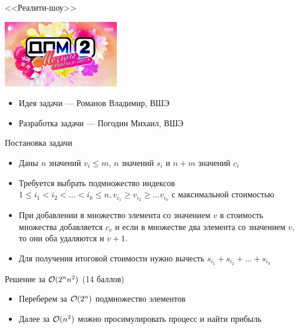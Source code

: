 \begin{frame}
  \begin{center}
    \LARGE <<Реалити-шоу>>
  \end{center}

  \begin{center}
      \includegraphics[width=5cm]{g-meme.jpg}
  \end{center}

  \begin{itemize}
  \item Идея задачи --- Романов Владимир, ВШЭ
  \item Разработка задачи --- Погодин Михаил, ВШЭ
  \end{itemize}

\end{frame}

\begin{frame}{Постановка задачи}
  \begin{itemize}
  \item Даны $n$ значений $v_i \leq m$, $n$ значений $s_i$ и $n + m$ значений $c_i$
  \item Требуется выбрать подмножество индексов $1 \leq i_1 < i_2 < ... < i_k \leq n, v_{i_1} \geq v_{i_2} \geq ... v_{i_k}$ с максимальной стоимостью
  \item При добавлении в множество элемента со значением $v$ в стоимость множества добавляется $c_v$ и если в множестве два элемента со значением $v$, то они оба удаляются и $v + 1$.
  \item Для получения итоговой стоимости нужно вычесть $s_{i_1} + s_{i_2} + ... + s_{i_k}$
  \end{itemize}
\end{frame}

\begin{frame}{Решение за $\mathcal{O}(2^n n^2)$ (14 баллов)}
  \begin{itemize}
  \item Переберем за $\mathcal{O}(2^n)$ подмножество элементов
  \item Далее за $\mathcal{O}(n^2)$ можно просимулировать процесс и найти прибыль
  \end{itemize}
\end{frame}

